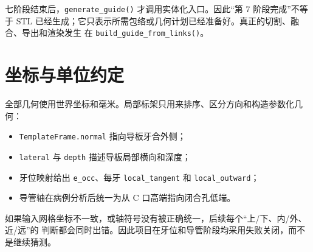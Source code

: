 七阶段结束后，\texttt{generate\_guide()} 才调用实体化入口。因此“第 7 阶段完成”不等于
STL 已经生成；它只表示所需包络或几何计划已经准备好。真正的切割、融合、导出和渲染发生
在 \texttt{build\_guide\_from\_links()}。

\section{坐标与单位约定}

全部几何使用世界坐标和毫米。局部标架只用来排序、区分方向和构造参数化几何：

\begin{itemize}
  \item \texttt{TemplateFrame.normal} 指向导板牙合外侧；
  \item \texttt{lateral} 与 \texttt{depth} 描述导板局部横向和深度；
  \item 牙位映射给出 \texttt{e\_occ}、每牙 \texttt{local\_tangent} 和
    \texttt{local\_outward}；
  \item 导管轴在病例分析后统一为从 C 口高端指向闭合孔低端。
\end{itemize}

如果输入网格坐标不一致，或轴符号没有被正确统一，后续每个“上/下、内/外、近/远”的
判断都会同时出错。因此项目在牙位和导管阶段均采用失败关闭，而不是继续猜测。

